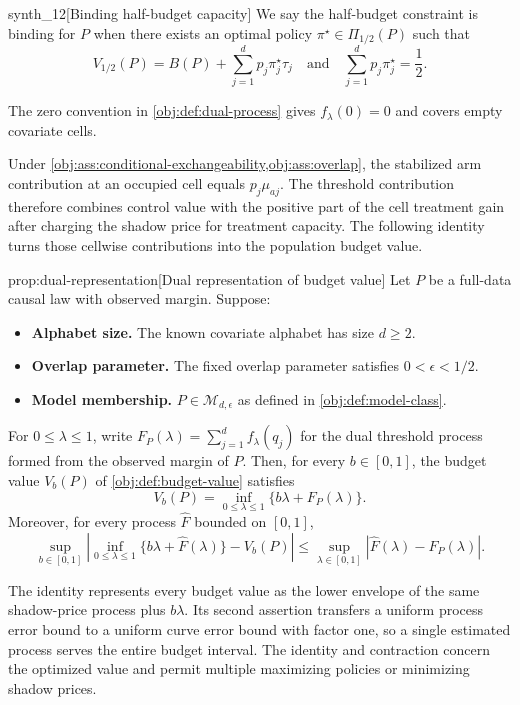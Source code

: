 \documentclass[11pt]{article}
\begin{document}
\begin{definitionv}{synth_12}[Binding half-budget capacity]
We say the half-budget constraint is binding for \(P\) when there exists an optimal policy \(\pi^\star\in\Pi_{1/2}(P)\) such that
\[
V_{1/2}(P)=B(P)+\sum_{j=1}^d p_j\pi^\star_j\tau_j
\quad\text{and}\quad
\sum_{j=1}^d p_j\pi^\star_j=\frac12.
\]
\end{definitionv}

The zero convention in \cref{obj:def:dual-process} gives \(f_\lambda(0)=0\) and covers empty covariate cells.

Under \cref{obj:ass:conditional-exchangeability,obj:ass:overlap}, the stabilized arm contribution at an occupied cell equals \(p_j\mu_{aj}\). The threshold contribution therefore combines control value with the positive part of the cell treatment gain after charging the shadow price for treatment capacity. The following identity turns those cellwise contributions into the population budget value.

\begin{propositionv}{prop:dual-representation}[Dual representation of budget value]
Let \(P\) be a full-data causal law with observed margin. Suppose:
\begin{itemize}
\item \textbf{Alphabet size.} The known covariate alphabet has size \(d\ge 2\).
\item \textbf{Overlap parameter.} The fixed overlap parameter satisfies \(0<\epsilon<1/2\).
\item \textbf{Model membership.} \(P\in\mathcal M_{d,\epsilon}\) as defined in \cref{obj:def:model-class}.
\end{itemize}
For \(0\le\lambda\le1\), write \(F_P(\lambda)=\sum_{j=1}^{d}f_\lambda(q_j)\) for the dual threshold process formed from the observed margin of \(P\). Then, for every \(b\in[0,1]\), the budget value \(V_b(P)\) of \cref{obj:def:budget-value} satisfies
\[
V_b(P)=\inf_{0\le\lambda\le1}\{b\lambda+F_P(\lambda)\}.
\]
Moreover, for every process \(\widehat F\) bounded on \([0,1]\),
\[
\sup_{b\in[0,1]}
\left|
\inf_{0\le\lambda\le1}\{b\lambda+\widehat F(\lambda)\}
-V_b(P)
\right|
\le
\sup_{\lambda\in[0,1]}
\left|\widehat F(\lambda)-F_P(\lambda)\right|.
\]
\end{propositionv}

The identity represents every budget value as the lower envelope of the same shadow-price process plus \(b\lambda\). Its second assertion transfers a uniform process error bound to a uniform curve error bound with factor one, so a single estimated process serves the entire budget interval. The identity and contraction concern the optimized value and permit multiple maximizing policies or minimizing shadow prices.
\end{document}
